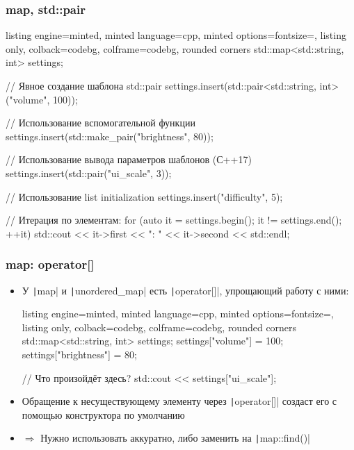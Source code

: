 \documentclass[10pt]{beamer}
\begin{document}
\begin{frame}[fragile]
\frametitle{map, std::pair}
\begin{itemize}
\begin{tcblisting}{listing engine=minted, minted language=cpp, minted options={fontsize=\scriptsize}, listing only, colback=codebg, colframe=codebg, rounded corners}
std::map<std::string, int> settings;

// Явное создание шаблона std::pair
settings.insert(std::pair<std::string, int>("volume", 100));

// Использование вспомогательной функции
settings.insert(std::make_pair("brightness", 80));

// Использование вывода параметров шаблонов (С++17)
settings.insert(std::pair("ui_scale", 3));

// Использование list initialization
settings.insert({"difficulty", 5});

// Итерация по элементам:
for (auto it = settings.begin(); it != settings.end(); ++it)
  std::cout << it->first << ": " << it->second << std::endl;
\end{tcblisting}
\end{itemize}
\end{frame}

\begin{frame}[fragile]
\frametitle{map: operator[]}
\begin{itemize}
\item У \texttt|map| и \texttt|unordered_map| есть \texttt|operator[]|, упрощающий работу с ними:
\begin{tcblisting}{listing engine=minted, minted language=cpp, minted options={fontsize=\scriptsize}, listing only, colback=codebg, colframe=codebg, rounded corners}
std::map<std::string, int> settings;
settings["volume"] = 100;
settings["brightness"] = 80;

// Что произойдёт здесь?
std::cout << settings["ui_scale"];
\end{tcblisting}
\pause
{}
\item Обращение к несуществующему элементу через \texttt|operator[]| создаст его с помощью конструктора по умолчанию
\pause
\item \(\Longrightarrow\) Нужно использовать аккуратно, либо заменить на \texttt|map::find()|
\end{itemize}
\end{frame}
\end{document}
